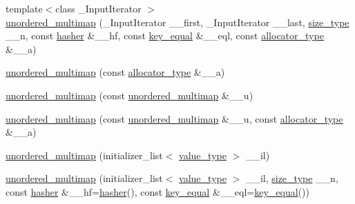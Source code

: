 \begin{DoxyCompactItemize}
\item 
{\footnotesize template$<$class \+\_\+\+Input\+Iterator $>$ }\\\hyperlink{classunordered__multimap_ae65029d3be22defe22edb63354b9977b}{unordered\+\_\+multimap} (\+\_\+\+Input\+Iterator \+\_\+\+\_\+first, \+\_\+\+Input\+Iterator \+\_\+\+\_\+last, \hyperlink{classunordered__multimap_a977c4093df6d4d0302f280de19af4b58}{size\+\_\+type} \+\_\+\+\_\+n, const \hyperlink{classunordered__multimap_a93affc33f5ee930cff353ff62d20daef}{hasher} \&\+\_\+\+\_\+hf, const \hyperlink{classunordered__multimap_aeed817e3baaf0771b8336eb2477f4f02}{key\+\_\+equal} \&\+\_\+\+\_\+eql, const \hyperlink{classunordered__multimap_a821ff3be687cecd9ef325efa93759c19}{allocator\+\_\+type} \&\+\_\+\+\_\+a)
\item 
\hyperlink{classunordered__multimap_a58d14916504aa44b43bda4970ed4de03}{unordered\+\_\+multimap} (const \hyperlink{classunordered__multimap_a821ff3be687cecd9ef325efa93759c19}{allocator\+\_\+type} \&\+\_\+\+\_\+a)
\item 
\hyperlink{classunordered__multimap_ae2a482dd86bbc7f611f53b61a905de90}{unordered\+\_\+multimap} (const \hyperlink{classunordered__multimap}{unordered\+\_\+multimap} \&\+\_\+\+\_\+u)
\item 
\hyperlink{classunordered__multimap_a41d280f0f2fe9d49aa03aea294e7f776}{unordered\+\_\+multimap} (const \hyperlink{classunordered__multimap}{unordered\+\_\+multimap} \&\+\_\+\+\_\+u, const \hyperlink{classunordered__multimap_a821ff3be687cecd9ef325efa93759c19}{allocator\+\_\+type} \&\+\_\+\+\_\+a)
\item 
\hyperlink{classunordered__multimap_a29c5dd4a78fd4bd8a9645931dc7f1caa}{unordered\+\_\+multimap} (initializer\+\_\+list$<$ \hyperlink{classunordered__multimap_a106d390dc0deafc47f10d3943b247ee6}{value\+\_\+type} $>$ \+\_\+\+\_\+il)
\item 
\hyperlink{classunordered__multimap_affbf2f2daf17c60953eddf1e4714a98c}{unordered\+\_\+multimap} (initializer\+\_\+list$<$ \hyperlink{classunordered__multimap_a106d390dc0deafc47f10d3943b247ee6}{value\+\_\+type} $>$ \+\_\+\+\_\+il, \hyperlink{classunordered__multimap_a977c4093df6d4d0302f280de19af4b58}{size\+\_\+type} \+\_\+\+\_\+n, const \hyperlink{classunordered__multimap_a93affc33f5ee930cff353ff62d20daef}{hasher} \&\+\_\+\+\_\+hf=\hyperlink{classunordered__multimap_a93affc33f5ee930cff353ff62d20daef}{hasher}(), const \hyperlink{classunordered__multimap_aeed817e3baaf0771b8336eb2477f4f02}{key\+\_\+equal} \&\+\_\+\+\_\+eql=\hyperlink{classunordered__multimap_aeed817e3baaf0771b8336eb2477f4f02}{key\+\_\+equal}())

\end{DoxyCompactItemize}

